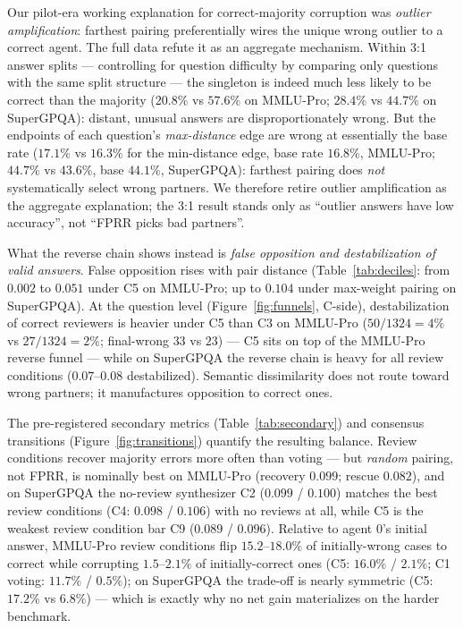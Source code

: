 \documentclass[11pt]{article}
\begin{document}
Our pilot-era working explanation for correct-majority corruption was \emph{outlier amplification}: farthest pairing preferentially wires the unique wrong outlier to a correct agent. The full data refute it as an aggregate mechanism. Within 3:1 answer splits --- controlling for question difficulty by comparing only questions with the same split structure --- the singleton is indeed much less likely to be correct than the majority ($20.8\%$ vs $57.6\%$ on MMLU-Pro; $28.4\%$ vs $44.7\%$ on SuperGPQA): distant, unusual answers are disproportionately wrong. But the endpoints of each question's \emph{max-distance} edge are wrong at essentially the base rate ($17.1\%$ vs $16.3\%$ for the min-distance edge, base rate $16.8\%$, MMLU-Pro; $44.7\%$ vs $43.6\%$, base $44.1\%$, SuperGPQA): farthest pairing does \emph{not} systematically select wrong partners. We therefore retire outlier amplification as the aggregate explanation; the 3:1 result stands only as ``outlier answers have low accuracy'', not ``FPRR picks bad partners''.

What the reverse chain shows instead is \emph{false opposition and destabilization of valid answers}. False opposition rises with pair distance (Table~\ref{tab:deciles}: from $0.002$ to $0.051$ under C5 on MMLU-Pro; up to $0.104$ under max-weight pairing on SuperGPQA). At the question level (Figure~\ref{fig:funnels}, C-side), destabilization of correct reviewers is heavier under C5 than C3 on MMLU-Pro ($50/1324 = 4\%$ vs $27/1324 = 2\%$; final-wrong $33$ vs $23$) --- C5 sits on top of the MMLU-Pro reverse funnel --- while on SuperGPQA the reverse chain is heavy for all review conditions ($0.07$--$0.08$ destabilized). Semantic dissimilarity does not route toward wrong partners; it manufactures opposition to correct ones.

The pre-registered secondary metrics (Table~\ref{tab:secondary}) and consensus transitions (Figure~\ref{fig:transitions}) quantify the resulting balance. Review conditions recover majority errors more often than voting --- but \emph{random} pairing, not FPRR, is nominally best on MMLU-Pro (recovery $0.099$; rescue $0.082$), and on SuperGPQA the no-review synthesizer C2 ($0.099$ / $0.100$) matches the best review conditions (C4: $0.098$ / $0.106$) with no reviews at all, while C5 is the weakest review condition bar C9 ($0.089$ / $0.096$). Relative to agent 0's initial answer, MMLU-Pro review conditions flip $15.2$--$18.0\%$ of initially-wrong cases to correct while corrupting $1.5$--$2.1\%$ of initially-correct ones (C5: $16.0\%$ / $2.1\%$; C1 voting: $11.7\%$ / $0.5\%$); on SuperGPQA the trade-off is nearly symmetric (C5: $17.2\%$ vs $6.8\%$) --- which is exactly why no net gain materializes on the harder benchmark.
\end{document}
